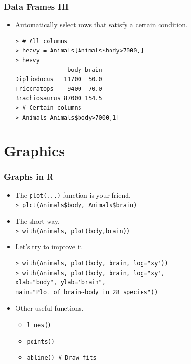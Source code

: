 \documentclass{beamer}
\begin{document}

\begin{frame}[fragile]

 \frametitle{Data Frames III}
 \begin{itemize}
  \item Automatically select rows that satisfy a
  certain condition.
  \begin{verbatim}
> # All columns
> heavy = Animals[Animals$body>7000,]
> heavy
               body brain
Dipliodocus   11700  50.0
Triceratops    9400  70.0
Brachiosaurus 87000 154.5
> # Certain columns
> Animals[Animals$body>7000,1]
  \end{verbatim}
  \end{itemize}

\end{frame}


\section{Graphics}


\begin{frame}[fragile]

 \frametitle{Graphs in R}
 \begin{itemize}
  \item The \texttt{plot(...)} function is your friend.\\
  \texttt{> plot(Animals\$body, Animals\$brain)}
  \item The short way.\\
  \texttt{> with(Animals, plot(body,brain))}
  \item Let's try to improve it
  \begin{verbatim}
> with(Animals, plot(body, brain, log="xy"))
> with(Animals, plot(body, brain, log="xy",
xlab="body", ylab="brain", 
main="Plot of brain~body in 28 species"))
  \end{verbatim}
  \vspace{-0.5cm}
  \item Other useful functions.
  \begin{itemize}
   \item \texttt{lines()}
   \item \texttt{points()}
   \item \texttt{abline() \# Draw fits}
  \end{itemize}
  \end{itemize}

\end{frame}
\end{document}
